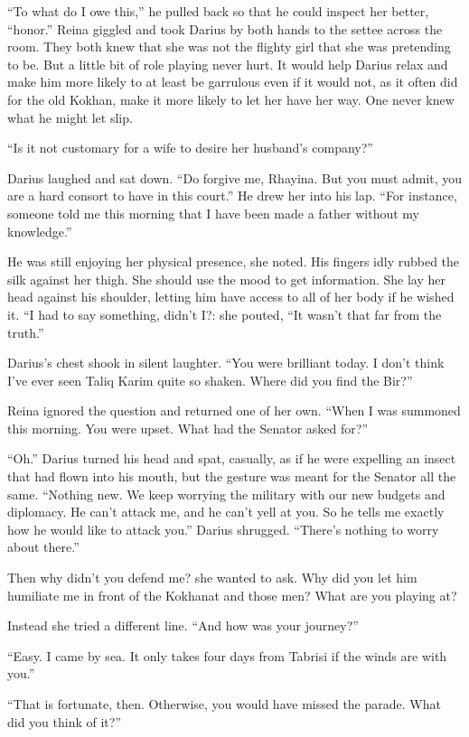 \documentclass{article}
\begin{document}
	“To what do I owe this,” he pulled back so that he could inspect her better, “honor.” Reina giggled and took Darius by both hands to the settee across the room. They both knew that she was not the flighty girl that she was pretending to be. But a little bit of role playing never hurt. It would help Darius relax and make him more likely to at least be garrulous even if it would not, as it often did for the old Kokhan, make it more likely to let her have her way. One never knew what he might let slip.
	
	“Is it not customary for a wife to desire her husband’s company?”
	
	Darius laughed and sat down. “Do forgive me, Rhayina. But you must admit, you are a hard consort to have in this court.” He drew her into his lap. “For instance, someone told me this morning that I have been made a father without my knowledge.”
	
	He was still enjoying her physical presence, she noted. His fingers idly rubbed the silk against her thigh. She should use the mood to get information. She lay her head against his shoulder, letting him have access to all of her body if he wished it. “I had to say something, didn’t I?: she pouted, “It wasn’t that far from the truth.”
	
	Darius’s chest shook in silent laughter. “You were brilliant today. I don’t think I’ve ever seen Taliq Karim quite so shaken. Where did you find the Bir?”
	
	Reina ignored the question and returned one of her own. “When I was summoned this morning. You were upset. What had the Senator asked for?”
	
	“Oh.” Darius turned his head and spat, casually, as if he were expelling an insect that had flown into his mouth, but the gesture was meant for the Senator all the same. “Nothing new. We keep worrying the military with our new budgets and diplomacy. He can’t attack me, and he can’t yell at you. So he tells me exactly how he would like to attack you.” Darius shrugged. “There’s nothing to worry about there.” 
	
	Then why didn’t you defend me? she wanted to ask. Why did you let him humiliate me in front of the Kokhanat and those men? What are you playing at? 
	
	Instead she tried a different line. “And how was your journey?”
	
	“Easy. I came by sea. It only takes four days from Tabrisi if the winds are with you.” 
	
	“That is fortunate, then. Otherwise, you would have missed the parade. What did you think of it?”
	
\end{document}
